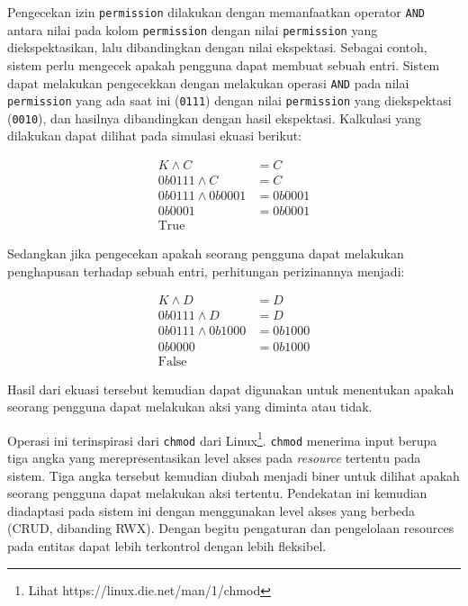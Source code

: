    Pengecekan izin \texttt{permission} dilakukan dengan memanfaatkan operator \texttt{AND} antara 
    nilai pada kolom \texttt{permission} dengan nilai \texttt{permission} yang diekspektasikan, lalu
    dibandingkan dengan nilai ekspektasi.
    Sebagai contoh, sistem perlu mengecek apakah pengguna dapat membuat sebuah entri. 
    Sistem dapat melakukan pengecekkan dengan melakukan operasi \texttt{AND} pada nilai 
    \texttt{permission} yang ada saat ini (\texttt{0111}) dengan nilai \texttt{permission} yang
    diekspektasi (\texttt{0010}), dan hasilnya dibandingkan dengan hasil ekspektasi. Kalkulasi
    yang dilakukan dapat dilihat pada simulasi ekuasi berikut:
    
    \begin{subequations}
        \begin{align}
            K \wedge C &= C \\
            0b0111 \wedge C &= C \\
            0b0111 \wedge 0b0001 &= 0b0001 \\
            0b0001 &= 0b0001 \\
            \text{True}
        \end{align}
    \end{subequations}
    
    Sedangkan jika pengecekan apakah seorang pengguna dapat melakukan penghapusan terhadap sebuah entri,
    perhitungan perizinannya menjadi:
    
    \begin{subequations}
        \begin{align}
            K \wedge D &= D \\
            0b0111 \wedge D &= D \\
            0b0111 \wedge 0b1000 &= 0b1000 \\
            0b0000 &= 0b1000 \\
            \text{False}
        \end{align}
    \end{subequations}
    
    Hasil dari ekuasi tersebut kemudian dapat digunakan untuk menentukan apakah seorang pengguna dapat
    melakukan aksi yang diminta atau tidak.
    
    Operasi ini terinspirasi dari \texttt{chmod} dari Linux\footnote{Lihat https://linux.die.net/man/1/chmod}.
    \texttt{chmod} menerima input berupa tiga angka yang merepresentasikan level akses pada \textit{resource}
    tertentu pada sistem. Tiga angka tersebut kemudian diubah menjadi biner untuk dilihat apakah
    seorang pengguna dapat melakukan aksi tertentu. Pendekatan ini kemudian diadaptasi pada sistem ini
    dengan menggunakan level akses yang berbeda (CRUD, dibanding RWX). Dengan begitu pengaturan dan
    pengelolaan resources pada entitas dapat lebih terkontrol dengan lebih fleksibel.
    
